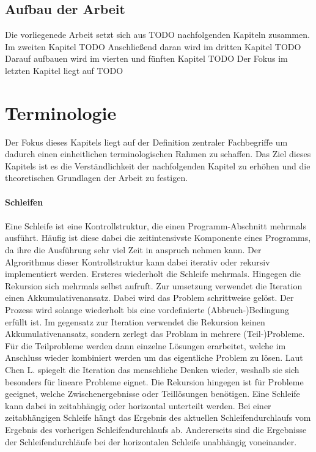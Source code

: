 \documentclass{article}
\begin{document}
    \subsection{Aufbau der Arbeit}
    Die vorliegenede Arbeit setzt sich aus TODO nachfolgenden Kapiteln zusammen. 
    Im zweiten Kapitel TODO
    Anschließend daran wird im dritten Kapitel TODO
    Darauf aufbauen wird im vierten und fünften Kapitel TODO
    Der Fokus im letzten Kapitel liegt auf TODO 
    \newpage
    \section{Terminologie}
    Der Fokus dieses Kapitels liegt auf der Definition zentraler Fachbegriffe um dadurch einen einheitlichen terminologischen Rahmen zu schaffen. 
    Das Ziel dieses Kapitels ist es die Verständlichkeit der nachfolgenden Kapitel zu erhöhen und die theoretischen Grundlagen der Arbeit zu festigen.\\
    \\
    \textbf{Schleifen}\\
    \\
    Eine Schleife ist eine Kontrollstruktur, die einen Programm-Abschnitt mehrmals ausführt. \cite{22}
    Häufig ist diese dabei die zeitintensivste Komponente eines Programms, da ihre die Ausführung sehr viel Zeit in anspruch nehmen kann. \cite{1}
    Der Algrorithmus dieser Kontrollstruktur kann dabei iterativ oder rekursiv implementiert werden. Ersteres wiederholt die Schleife mehrmals. Hingegen die Rekursion sich mehrmals selbst aufruft. \cite{3}
    Zur umsetzung verwendet die Iteration einen Akkumulativenansatz. Dabei wird das Problem schrittweise gelöst. Der Prozess wird solange wiederholt bis eine vordefinierte (Abbruch-)Bedingung erfüllt ist. \cite{3}
    Im gegensatz zur Iteration verwendet die Rekursion keinen Akkumulativenansatz, sondern zerlegt das Problam in mehrere (Teil-)Probleme. Für die Teilprobleme werden dann einzelne Lösungen erarbeitet, welche im Anschluss wieder kombiniert werden um das eigentliche Problem zu lösen. \cite{3}
    Laut Chen L. spiegelt die Iteration das menschliche Denken wieder, weshalb sie sich besonders für lineare Probleme eignet. 
    Die Rekursion hingegen ist für Probleme geeignet, welche Zwischenergebnisse oder Teillösungen benötigen. \cite{3}
    Eine Schleife kann dabei in zeitabhängig oder horizontal unterteilt werden. Bei einer zeitabhängigen Schleife hängt das Ergebnis des aktuellen Schleifendurchlaufs vom Ergebnis des vorherigen Schleifendurchlaufs ab. Andererseits sind die Ergebnisse der Schleifendurchläufe bei der horizontalen Schleife unabhängig voneinander. \cite{5}\\
\end{document}
